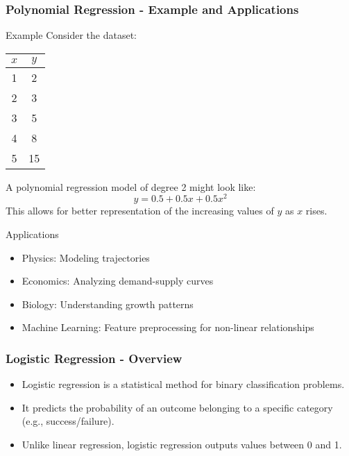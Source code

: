\documentclass[aspectratio=169]{beamer}
\begin{document}
\begin{frame}[fragile]
    \frametitle{Polynomial Regression - Example and Applications}
    \begin{block}{Example}
        Consider the dataset:
        \begin{center}
            \begin{tabular}{|c|c|}
                \hline
                $x$ & $y$ \\
                \hline
                1 & 2 \\
                2 & 3 \\
                3 & 5 \\
                4 & 8 \\
                5 & 15 \\
                \hline
            \end{tabular}
        \end{center}
        A polynomial regression model of degree 2 might look like:
        \begin{equation}
            y = 0.5 + 0.5x + 0.5x^2
        \end{equation}
        This allows for better representation of the increasing values of $y$ as $x$ rises.
    \end{block}

    \begin{block}{Applications}
        \begin{itemize}
            \item Physics: Modeling trajectories
            \item Economics: Analyzing demand-supply curves
            \item Biology: Understanding growth patterns
            \item Machine Learning: Feature preprocessing for non-linear relationships
        \end{itemize}
    \end{block}
\end{frame}

\begin{frame}[fragile]
    \frametitle{Logistic Regression - Overview}
    \begin{itemize}
        \item Logistic regression is a statistical method for binary classification problems.
        \item It predicts the probability of an outcome belonging to a specific category (e.g., success/failure).
        \item Unlike linear regression, logistic regression outputs values between 0 and 1.
    \end{itemize}
\end{frame}
\end{document}
